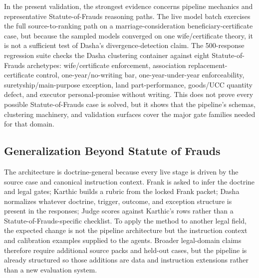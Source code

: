 In the present validation, the strongest evidence concerns pipeline mechanics
and representative Statute-of-Frauds reasoning paths. The live model batch
exercises the full source-to-ranking path on a marriage-consideration
beneficiary-certificate case, but because the sampled models converged on one
wife/certificate theory, it is not a sufficient test of Dasha's
divergence-detection claim. The 500-response regression suite checks the Dasha
clustering container against eight Statute-of-Frauds archetypes:
wife/certificate enforcement,
association replacement-certificate control, one-year/no-writing bar,
one-year-under-year enforceability, suretyship/main-purpose exception, land
part-performance, goods/UCC quantity defect, and executor personal-promise
without writing. This does not prove every possible Statute-of-Frauds case is
solved, but it shows that the pipeline's schemas, clustering machinery, and
validation surfaces cover the major gate families needed for that domain.

\subsection{Generalization Beyond Statute of Frauds}

The architecture is doctrine-general because every live stage is driven by the
source case and canonical instruction context. Frank is asked to infer the
doctrine and legal gates; Karthic builds a rubric from the locked Frank packet;
Dasha normalizes whatever doctrine, trigger, outcome, and exception structure is
present in the responses; Judge scores against Karthic's rows rather than a
Statute-of-Frauds-specific checklist. To apply the method to another legal
field, the expected change is not the pipeline architecture but the instruction
context and calibration examples supplied to the agents. Broader legal-domain
claims therefore require additional source packs and held-out cases, but the
pipeline is already structured so those additions are data and instruction
extensions rather than a new evaluation system.
